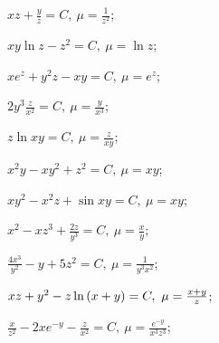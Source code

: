 \begin{enumsols}
		\label{sol:nonlinsys_pfaff:int_factor}
		\item \( xz + \frac{y}{z} = C, ~ \mu = \frac{1}{z^2} \); \sfill %
		\item \( xy \ln{z} - z^2 = C, ~ \mu = \ln{z} \); \sfill %
		\item \( xe^z + y^2 z - xy = C, ~ \mu = e^z \); \sfill %
		\item \( 2y^3 \frac{z}{x^2} = C, ~ \mu = \frac{y}{x^3} \); \sfill %
		\item \( z \ln{xy} = C, ~ \mu = \frac{z}{xy} \); \sfill %
		\item \( x^2 y - xy^2 + z^2 = C, ~ \mu = xy \); \sfill %
		\item \( xy^2 - x^2 z + \sin{xy} = C, ~ \mu = xy \); \sfill %
		\item \( x^2 - xz^3 + \frac{2z}{y^3} = C, ~ \mu = \frac{x}{y} \); \sfill %
		\item \( \frac{4x^3}{y^2} - y + 5z^2 = C, ~ \mu = \frac{1}{y^3 x^2} \); \sfill %
		\item \( xz + y^2 - z \ln\left( x + y \right) = C, ~ \mu = \frac{x + y}{z} \); \sfill %
		\item \( \frac{x}{z^2} -2x e^{-y} - \frac{z}{x^2} = C, ~ \mu = \frac{e^{-y}}{x^3 z^3} \); \sfill %
		

\end{enumsols}
